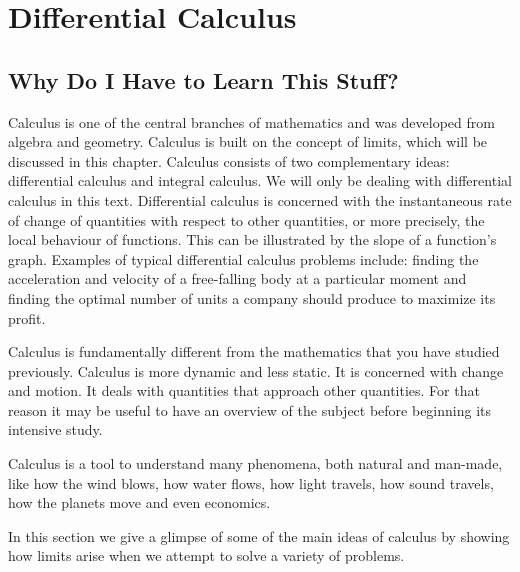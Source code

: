 \chapter{Differential Calculus}
\label{m:fg:diff12}

\section{Why Do I Have to Learn This Stuff?}
Calculus is one of the central branches of mathematics and was developed from algebra and geometry. Calculus is built on the concept of limits, which will be discussed in this chapter. Calculus consists of two complementary ideas: differential calculus and integral calculus. We will only be dealing with differential calculus in this text. Differential calculus is concerned with the instantaneous rate of change of quantities with respect to other quantities, or more precisely, the local behaviour of functions. This can be illustrated by the slope of a function's graph. Examples of typical differential calculus problems include: finding the acceleration and velocity of a free-falling body at a particular moment and finding the optimal number of units a company should produce to maximize its profit.

Calculus is fundamentally different from the mathematics that you have studied previously. Calculus is more dynamic and less static. It is concerned with change and motion. It deals with quantities that approach other quantities. For that reason it may be useful to have an overview of the subject before beginning its intensive study. 

Calculus is a tool to understand many phenomena, both natural and man-made, like how the wind blows, how water flows, how light travels, how sound travels, how the planets move and even economics.

In this section we give a glimpse of some of the main ideas of calculus by showing how limits arise when we attempt to solve a variety of problems.



